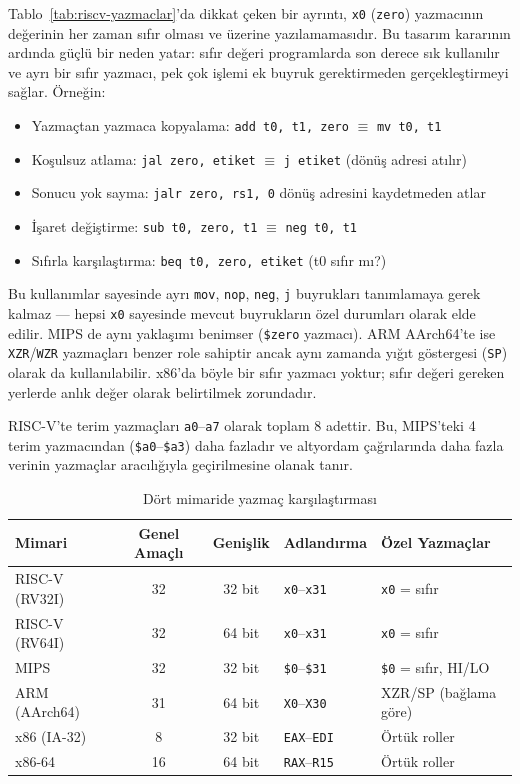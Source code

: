 Tablo~\ref{tab:riscv-yazmaclar}'da dikkat çeken bir ayrıntı, \texttt{x0} (\texttt{zero}) yazmacının değerinin her zaman sıfır olması ve üzerine yazılamamasıdır. Bu tasarım kararının ardında güçlü bir neden yatar: sıfır değeri programlarda son derece sık kullanılır ve ayrı bir sıfır yazmacı, pek çok işlemi ek buyruk gerektirmeden gerçekleştirmeyi sağlar. Örneğin:

\begin{itemize}[nosep]
\item Yazmaçtan yazmaca kopyalama: \texttt{add t0, t1, zero} $\equiv$ \texttt{mv t0, t1}
\item Koşulsuz atlama: \texttt{jal zero, etiket} $\equiv$ \texttt{j etiket} (dönüş adresi atılır)
\item Sonucu yok sayma: \texttt{jalr zero, rs1, 0} dönüş adresini kaydetmeden atlar
\item İşaret değiştirme: \texttt{sub t0, zero, t1} $\equiv$ \texttt{neg t0, t1}
\item Sıfırla karşılaştırma: \texttt{beq t0, zero, etiket} (t0 sıfır mı?)
\end{itemize}

Bu kullanımlar sayesinde ayrı \texttt{mov}, \texttt{nop}, \texttt{neg}, \texttt{j} buyrukları tanımlamaya gerek kalmaz --- hepsi \texttt{x0} sayesinde mevcut buyrukların özel durumları olarak elde edilir. MIPS de aynı yaklaşımı benimser (\texttt{\$zero} yazmacı). ARM AArch64'te ise \texttt{XZR}/\texttt{WZR} yazmaçları benzer role sahiptir ancak aynı zamanda yığıt göstergesi (\texttt{SP}) olarak da kullanılabilir. x86'da böyle bir sıfır yazmacı yoktur; sıfır değeri gereken yerlerde anlık değer olarak belirtilmek zorundadır.

RISC-V'te terim yazmaçları \texttt{a0}--\texttt{a7} olarak toplam 8 adettir. Bu, MIPS'teki 4 terim yazmacından (\texttt{\$a0}--\texttt{\$a3}) daha fazladır ve altyordam çağrılarında daha fazla verinin yazmaçlar aracılığıyla geçirilmesine olanak tanır.

\begin{table}[H]
\centering
\caption{Dört mimaride yazmaç karşılaştırması}
\label{tab:yazmac-karsilastirma}
\small
\begin{tabular}{lccll}
\toprule
\textbf{Mimari} & \textbf{Genel Amaçlı} & \textbf{Genişlik} & \textbf{Adlandırma} & \textbf{Özel Yazmaçlar} \\
\midrule
RISC-V (RV32I) & 32 & 32 bit & \texttt{x0}--\texttt{x31} & \texttt{x0} = sıfır \\
RISC-V (RV64I) & 32 & 64 bit & \texttt{x0}--\texttt{x31} & \texttt{x0} = sıfır \\
MIPS            & 32 & 32 bit & \texttt{\$0}--\texttt{\$31} & \texttt{\$0} = sıfır, HI/LO \\
ARM (AArch64)   & 31 & 64 bit & \texttt{X0}--\texttt{X30} & XZR/SP (bağlama göre) \\
x86 (IA-32)     & 8  & 32 bit & \texttt{EAX}--\texttt{EDI} & Örtük roller \\
x86-64          & 16 & 64 bit & \texttt{RAX}--\texttt{R15} & Örtük roller \\
\bottomrule
\end{tabular}
\end{table}

